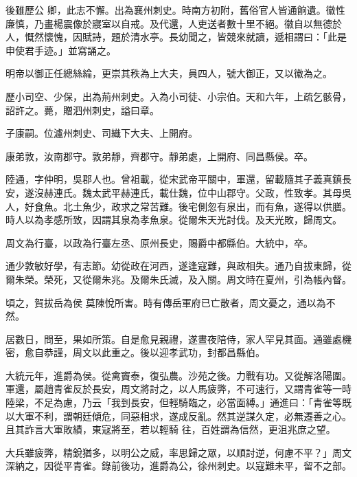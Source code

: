 \begin{pinyinscope}
 後雖歷公
 卿，此志不懈。出為襄州刺史。時南方初附，舊俗官人皆通餉遺。徽性廉慎，乃畫楊震像於寢室以自戒。及代還，人吏送者數十里不絕。徽自以無德於人，慨然懷愧，因賦詩，題於清水亭。長幼聞之，皆競來就讀，遞相謂曰：「此是申使君手迹。」並寫誦之。



 明帝以御正任總絲綸，更崇其秩為上大夫，員四人，號大御正，又以徽為之。



 歷小司空、少保，出為荊州刺史。入為小司徒、小宗伯。天和六年，上疏乞骸骨，詔許之。薨，贈泗州刺史，謚曰章。



 子康嗣。位瀘州刺史、司織下大夫、上開府。



 康弟敦，汝南郡守。敦弟靜，齊郡守。靜弟處，上開府、同昌縣侯。卒。



 陸通，字仲明，吳郡人也。曾祖載，從宋武帝平關中，軍還，留載隨其子義真鎮長安，遂沒赫連氏。魏太武平赫連氏，載仕魏，位中山郡守。父政，性致孝。其母吳人，好食魚。北土魚少，政求之常苦難。後宅側忽有泉出，而有魚，遂得以供膳。時人以為孝感所致，因謂其泉為孝魚泉。從爾朱天光討伐。及天光敗，歸周文。



 周文為行臺，以政為行臺左丞、原州長史，賜爵中都縣伯。大統中，卒。



 通少敦敏好學，有志節。幼從政在河西，遂逢寇難，與政相失。通乃自拔東歸，從爾朱榮。榮死，又從爾朱兆。及爾朱氏滅，及入關。周文時在夏州，引為帳內督。



 頃之，賀拔岳為侯
 莫陳悅所害。時有傳岳軍府已亡散者，周文憂之，通以為不然。



 居數日，問至，果如所策。自是愈見親禮，遂晝夜陪侍，家人罕見其面。通雖處機密，愈自恭謹，周文以此重之。後以迎孝武功，封都昌縣伯。



 大統元年，進爵為侯。從禽竇泰，復弘農。沙苑之後。力戰有功。又從解洛陽圍。軍還，屬趙青雀反於長安，周文將討之，以人馬疲弊，不可速行，又謂青雀等一時陸梁，不足為慮，乃云「我到長安，但輕騎臨之，必當面縛。」通進曰：「青雀等既以大軍不利，謂朝廷傾危，同惡相求，遂成反亂。然其逆謀久定，必無遷善之心。且其詐言大軍敗績，東寇將至，若以輕騎
 往，百姓謂為信然，更沮兆庶之望。



 大兵雖疲弊，精銳猶多，以明公之威，率思歸之眾，以順討逆，何慮不平？」周文深納之，因從平青雀。錄前後功，進爵為公，徐州刺史。以寇難未平，留不之部。




\end{pinyinscope}
